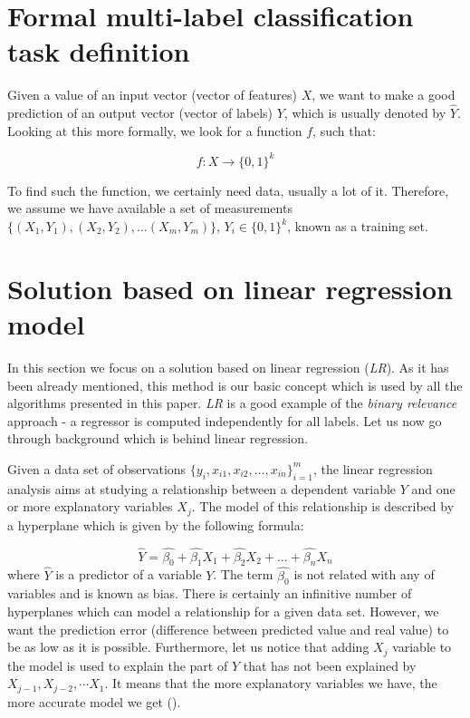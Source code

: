 \section{Formal multi-label classification task definition}

Given a value of an input vector (vector of features) $X$, we want to make a good prediction of an output vector (vector of labels) $Y$, which is usually denoted by $\hat{Y}$. Looking at this more formally, we look for a function $f$, such that:   

\begin{equation}\label{eq:def}
    f: X \rightarrow \{0,1\}^k 
\end{equation}

To find such the function, we certainly need data, usually a lot of it. Therefore, we assume we have available a set of measurements $\{(X_1, Y_1), (X_2, Y_2), \dots (X_m, Y_m)\}$, $Y_i\in\{0,1\}^k$, known as a training set.  

\section{Solution based on linear regression model}

In this section we focus on a solution based on linear regression (\textit{LR}). As it has been already mentioned, this method is our basic concept which is used by all the algorithms presented in this paper. \textit{LR} is a good example of the \textit{binary relevance} approach - a regressor is computed independently for all labels. Let us now go through background which is behind linear regression. 

Given a data set of observations $\{y_i, x_{i1}, x_{i2}, \dots, x_{in}\}_{i=1}^{m}$, the linear regression analysis aims at studying a relationship between a dependent variable $Y$ and one or more explanatory variables $X_{j}$. The model of this relationship is described by a hyperplane which is given by the following formula:

\begin{equation}\label{eq:LR1}
    \hat{Y} = \hat{\beta_0} + \hat{\beta_1}X_{1} + \hat{\beta_2}X_{2} + \dots + \hat{\beta_n}X_{n}
\end{equation}
where $\hat{Y}$ is a predictor of a variable $Y$. The term $\hat{\beta_0}$ is not related with any of variables and is known as bias. 
There is certainly an infinitive number of hyperplanes which can model a relationship for a given data set. However, we want the prediction error (difference between predicted value and real value) to be as low as it is possible. Furthermore, let us notice that adding $X_j$ variable to the model is used to explain the part of $Y$ that has not been explained by $X_{j-1}, X_{j-2}, \cdots X_1$. It means that the more explanatory variables we have, the more accurate model we get (\cite{Weisberg}).

